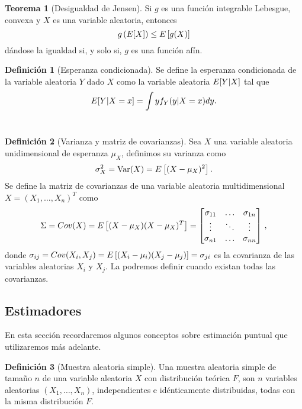 \documentclass[12pt,a4paper]{report} %
\let\mathbb\relax
\newcommand{\Var}{\text{Var}}
\theoremstyle{definition}
\newtheorem{definition}{Definición}[section]
\newtheorem{theorem}{Teorema}[section]
\begin{document}
\begin{theorem}[Desigualdad de Jensen]\label{th:jensen}
  Si $g$ es una función integrable Lebesgue, convexa y $X$ es una variable aleatoria, entonces\[
 g\left ( \E[X] \right) \leq \E\left[g(X)\right]
  \]
dándose la igualdad si, y solo si, $g$ es una función afín.\\
\end{theorem}

\begin{definition}[Esperanza condicionada]
  Se define la esperanza condicionada de la variable aleatoria $Y$ dado $X$ como la variable aleatoria $\mathbb{E}[Y|X]$ tal que \[
\mathbb{E} [ Y | X = x ] = \int y f_Y(y| X = x) dy.
  \] \\[-10pt]
  
\end{definition}
\begin{definition}[Varianza y matriz de covarianzas]
  Sea $X$ una variable aleatoria unidimensional de esperanza $\mu_X$, definimos su varianza como\[
\sigma_X^2 = \Var(X) = \mathbb{E}\left [ (X- \mu_X)^2 \right ].
  \]
  Se define la matriz de covarianzas de una variable aleatoria multidimensional $X= (X_1,\dots,X_n)^T$ como\[
\Sigma = Cov(X) = \mathbb{E}\left [(X-\mu_X)(X-\mu_X)^T \right ] =  \begin{bmatrix} \sigma_{11} & \dots & \sigma_{1n} \\ \vdots& \ddots & \vdots \\ \sigma_{n1} &  \dots & \sigma_{nn}\end{bmatrix}\,,
\]
donde $\sigma_{ij} = Cov(X_i, X_j) = \mathbb{E}\left[(X_i-\mu_i)(X_j-\mu_j)\right]=\sigma_{ji}$ es la covarianza de las variables aleatorias $X_i$ y $X_j$. La podremos definir cuando existan todas las covarianzas.\\ 
\end{definition}

\subsection{Estimadores}

En esta sección recordaremos algunos conceptos sobre estimación puntual que utilizaremos más adelante.\\

\begin{definition}[Muestra aleatoria simple]
  Una muestra aleatoria simple de tamaño $n$ de una variable aleatoria $X$ con distribución teórica $F$, son $n$ variables aleatorias $(X_1,\dots,X_n)$, independientes e idénticamente distribuidas, todas con la misma distribución $F$.\\
\end{definition}
\end{document}
